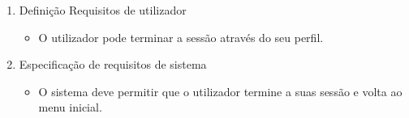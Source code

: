 \begin{enumerate}
    \item Definição Requisitos de utilizador
    \begin{itemize}
        \item O utilizador pode terminar a sessão através do seu perfil.
    \end{itemize}
    \item Especificação de requisitos de sistema
    \begin{itemize}
        \item O sistema deve permitir que o utilizador termine a suas sessão e volta ao menu inicial.
    \end{itemize}
\end{enumerate}